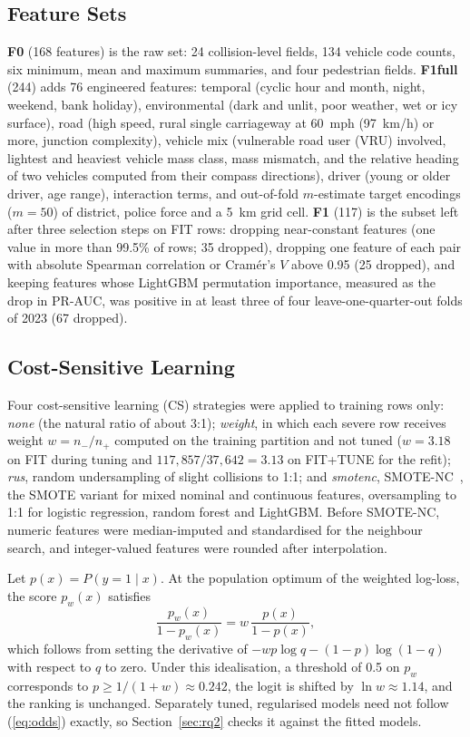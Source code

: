 \documentclass[conference,letterpaper]{IEEEtran}
\begin{document}
\subsection{Feature Sets}

\textbf{F0} (168 features) is the raw set: 24 collision-level fields, 134 vehicle code counts, six minimum, mean and maximum summaries, and four pedestrian fields. \textbf{F1full} (244) adds 76 engineered features: temporal (cyclic hour and month, night, weekend, bank holiday), environmental (dark and unlit, poor weather, wet or icy surface), road (high speed, rural single carriageway at 60~mph (97~km/h) or more, junction complexity), vehicle mix (vulnerable road user (VRU) involved, lightest and heaviest vehicle mass class, mass mismatch, and the relative heading of two vehicles computed from their compass directions), driver (young or older driver, age range), interaction terms, and out-of-fold $m$-estimate target encodings ($m=50$) of district, police force and a 5~km grid cell. \textbf{F1} (117) is the subset left after three selection steps on FIT rows: dropping near-constant features (one value in more than 99.5\% of rows; 35 dropped), dropping one feature of each pair with absolute Spearman correlation or Cram\'er's $V$ above 0.95 (25 dropped), and keeping features whose LightGBM permutation importance, measured as the drop in PR-AUC, was positive in at least three of four leave-one-quarter-out folds of 2023 (67 dropped).

\subsection{Cost-Sensitive Learning}

Four cost-sensitive learning (CS) strategies were applied to training rows only: \textit{none} (the natural ratio of about 3:1); \textit{weight}, in which each severe row receives weight $w=n_{-}/n_{+}$ computed on the training partition and not tuned ($w=3.18$ on FIT during tuning and $117{,}857/37{,}642=3.13$ on FIT+TUNE for the refit); \textit{rus}, random undersampling of slight collisions to 1:1; and \textit{smotenc}, SMOTE-NC~\cite{chawla2002smote}, the SMOTE variant for mixed nominal and continuous features, oversampling to 1:1 for logistic regression, random forest and LightGBM. Before SMOTE-NC, numeric features were median-imputed and standardised for the neighbour search, and integer-valued features were rounded after interpolation.

Let $p(x)=P(y=1\mid x)$. At the population optimum of the weighted log-loss, the score $p_w(x)$ satisfies
\begin{equation}
\frac{p_w(x)}{1-p_w(x)} = w\,\frac{p(x)}{1-p(x)},
\label{eq:odds}
\end{equation}
which follows from setting the derivative of $-wp\log q-(1-p)\log(1-q)$ with respect to $q$ to zero. Under this idealisation, a threshold of 0.5 on $p_w$ corresponds to $p\ge 1/(1+w)\approx 0.242$, the logit is shifted by $\ln w\approx 1.14$, and the ranking is unchanged. Separately tuned, regularised models need not follow (\ref{eq:odds}) exactly, so Section~\ref{sec:rq2} checks it against the fitted models.
\end{document}
